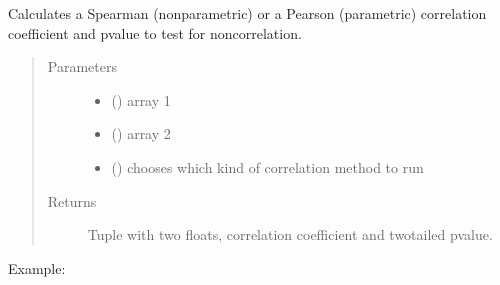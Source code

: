 \documentclass[letterpaper,10pt,english]{sphinxmanual}
\begin{document}
\begin{fulllineitems}
\label{\detokenize{_autosummary/analytics_core.analytics:analytics_core.analytics.analytics.calculate_correlations}}
Calculates a Spearman (nonparametric) or a Pearson (parametric) correlation coefficient and p\sphinxhyphen{}value to test for non\sphinxhyphen{}correlation.
\begin{quote}\begin{description}
\item[{Parameters}] \leavevmode\begin{itemize}
\item {} 
 () \textendash{} array 1

\item {} 
 () \textendash{} array 2

\item {} 
 () \textendash{} chooses which kind of correlation method to run

\end{itemize}

\item[{Returns}] \leavevmode
Tuple with two floats, correlation coefficient and two\sphinxhyphen{}tailed p\sphinxhyphen{}value.

\end{description}\end{quote}

Example:

\begin{sphinxVerbatim}[commandchars=\\\{\}]
    
\end{sphinxVerbatim}

\end{fulllineitems}
\end{document}
